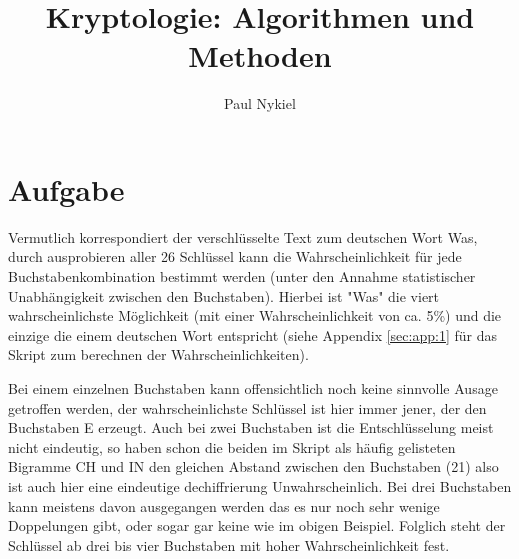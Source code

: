 \documentclass[DIN, pagenumber=false, fontsize=11pt, parskip=half]{scrartcl}
\title{Kryptologie: Algorithmen und Methoden}
\author{Paul Nykiel}
\begin{document}
    \maketitle
    
    \section{Aufgabe}
    Vermutlich korrespondiert der verschlüsselte Text zum deutschen Wort \glqq{}Was\grqq{},
    durch ausprobieren aller 26 Schlüssel kann die Wahrscheinlichkeit für jede
    Buchstabenkombination bestimmt werden (unter den Annahme statistischer Unabhängigkeit zwischen den Buchstaben). 
    Hierbei ist "Was" die viert wahrscheinlichste Möglichkeit (mit einer Wahrscheinlichkeit von ca. 5\%) und die einzige die einem deutschen Wort entspricht (siehe Appendix \ref{sec:app:1} für das Skript zum berechnen der Wahrscheinlichkeiten).

    Bei einem einzelnen Buchstaben kann offensichtlich noch keine sinnvolle Ausage getroffen werden, der wahrscheinlichste Schlüssel ist hier immer jener, der den Buchstaben \glqq{}E\grqq{} erzeugt. 
    Auch bei zwei Buchstaben ist die Entschlüsselung meist nicht eindeutig, so haben schon die beiden im Skript als häufig gelisteten Bigramme \glqq{}CH\grqq{} und \glqq{}IN\grqq{} den gleichen Abstand zwischen den Buchstaben (21) also ist auch hier eine eindeutige dechiffrierung Unwahrscheinlich.
    Bei drei Buchstaben kann meistens davon ausgegangen werden das es nur noch sehr wenige Doppelungen gibt, oder sogar gar keine wie im obigen Beispiel.
    Folglich steht der Schlüssel ab drei bis vier Buchstaben mit hoher Wahrscheinlichkeit fest.
\end{document}
